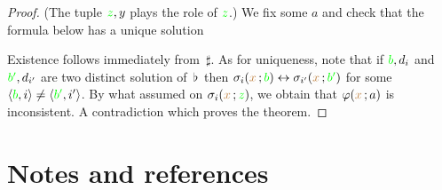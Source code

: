 \documentclass[creche.tex]{subfiles}
\begin{document}
\begin{proof}

(The tuple ${\color{green} z},y$ plays the role of ${\color{green} z}$.)  We fix some $a$ and check that the formula below has a unique solution


Existence follows immediately from $\,\sharp$. As for uniqueness, note that if ${\color{green} b},d_i$ and ${\color{green} b'},d_{i'}$ are two distinct solution of $\,\flat\,$ then $\sigma_i({\color{brown} x}\,;{\color{green} b})\leftrightarrow\sigma_{i'}({\color{brown} x}\,;{\color{green} b'})$ for some $\langle{\color{green}b},i\rangle\neq\langle{\color{green}b'},i'\rangle$. By what assumed on $\sigma_i({\color{brown} x}\,;{\color{green} z})$, we obtain that $\varphi({\color{brown} x}\,;a)$ is inconsistent. A contradiction which proves the theorem.
\end{proof}


\section{Notes and references}
\begin{biblist}[]\normalsize




\end{biblist}
\end{document}
